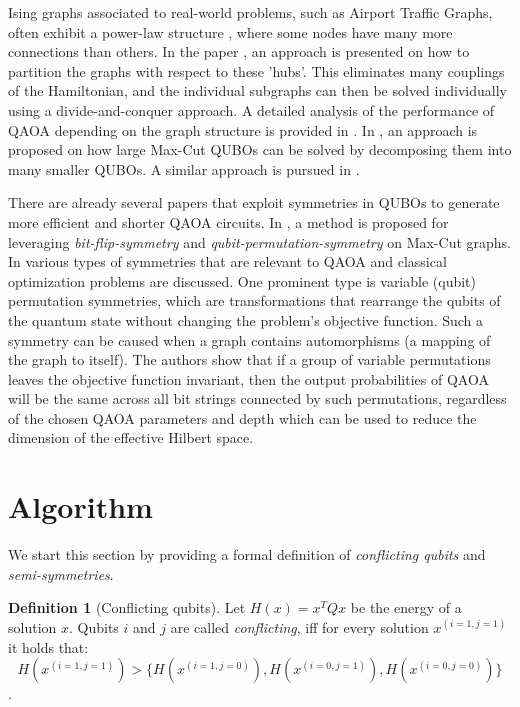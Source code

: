\documentclass[conference]{IEEEtran}
\theoremstyle{plain}
\theoremstyle{definition}
\newtheorem{definition}[theorem]{Definition}
\theoremstyle{remark}
\begin{document}
Ising graphs associated to real-world problems, such as Airport Traffic Graphs, often exhibit a power-law structure \cite{ayanzadeh2023frozenqubits}, where some nodes have many more connections than others. In the paper \cite{ayanzadeh2023frozenqubits}, an approach is presented on how to partition the graphs with respect to these 'hubs'. This eliminates many couplings of the Hamiltonian, and the individual subgraphs can then be solved individually using a divide-and-conquer approach. A detailed analysis of the performance of QAOA depending on the graph structure is provided in \cite{herrman2021impact}. In \cite{ponce2023graph}, an approach is proposed on how large Max-Cut QUBOs can be solved by decomposing them into many smaller QUBOs. A similar approach is pursued in \cite{majumdar2021depth}.

There are already several papers \cite{shaydulin2021error, shaydulin2021exploiting, shaydulin2020classical} that exploit symmetries in QUBOs to generate more efficient and shorter QAOA circuits. In \cite{shaydulin2021error}, a method is proposed for leveraging \textit{bit-flip-symmetry} and \textit{qubit-permutation-symmetry} on Max-Cut graphs. In \cite{shaydulin2020classical} various types of symmetries that are relevant to QAOA and classical optimization problems are discussed. One prominent type is variable (qubit) permutation symmetries, which are transformations that rearrange the qubits of the quantum state without changing the problem's objective function. Such a symmetry can be caused when a graph contains automorphisms (a mapping of the graph to itself). The authors show that if a group of variable permutations leaves the objective function invariant, then the output probabilities of QAOA will be the same across all bit strings connected by such permutations, regardless of the chosen QAOA parameters and depth which can be used to reduce the dimension of the effective Hilbert space.

\section{Algorithm}

We start this section by providing a formal definition of \textit{conflicting qubits} and \textit{semi-symmetries}.

\begin{definition}[Conflicting qubits]
Let $H(x) = x^T Q x$ be the energy of a solution $x$. Qubits $i$ and $j$ are called \textit{conflicting}, iff for every solution $x^{(i=1, j=1)}$ it holds that: \[ H(x^{(i=1, j=1)}) > \{ H(x^{(i=1, j=0)}), H(x^{(i=0, j=1)}), H(x^{(i=0, j=0)}) \} \].
\end{definition}
\end{document}
